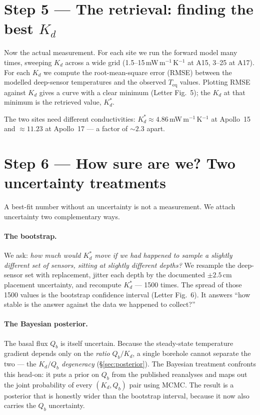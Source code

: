 \documentclass[11pt]{report}
\begin{document}
\section{Step 5 --- The retrieval: finding the best $K_d$}

Now the actual measurement. For each site we run the forward model
many times, sweeping $K_d$ across a wide grid (1.5--15\,mW\,m$^{-1}$\,K$^{-1}$
at A15, 3--25 at A17). For each $K_d$ we compute the
root-mean-square error (RMSE) between the modelled deep-sensor
temperatures and the observed $T_\mathrm{eq}$ values. Plotting RMSE
against $K_d$ gives a curve with a clear minimum (Letter Fig.~5);
the $K_d$ at that minimum is the retrieved value, $K_d^{*}$.

\begin{key}
The two sites need different conductivities:
$K_d^{*}\approx4.86$\,mW\,m$^{-1}$\,K$^{-1}$ at Apollo~15 and
$\approx11.23$ at Apollo~17 --- a factor of $\sim\!2.3$ apart.
\end{key}

\section{Step 6 --- How sure are we? Two uncertainty treatments}

A best-fit number without an uncertainty is not a measurement.
We attach uncertainty two complementary ways.

\paragraph{The bootstrap.} We ask: \emph{how much would $K_d^{*}$
move if we had happened to sample a slightly different set of
sensors, sitting at slightly different depths?} We resample the
deep-sensor set with replacement, jitter each depth by the
documented $\pm2.5$\,cm placement uncertainty, and recompute
$K_d^{*}$ --- 1500 times. The spread of those 1500 values is the
bootstrap confidence interval (Letter Fig.~6). It answers ``how
stable is the answer against the data we happened to collect?''

\paragraph{The Bayesian posterior.} The basal flux $Q_b$ is itself
uncertain. Because the steady-state temperature gradient depends
only on the \emph{ratio} $Q_b/K_d$, a single borehole cannot
separate the two --- the \emph{$K_d/Q_b$ degeneracy}
(\S\ref{sec:posterior}). The Bayesian treatment confronts this
head-on: it puts a prior on $Q_b$ from the published reanalyses and
maps out the joint probability of every $(K_d, Q_b)$ pair using
MCMC. The result is a posterior that is honestly wider than the
bootstrap interval, because it now also carries the $Q_b$
uncertainty.
\end{document}
